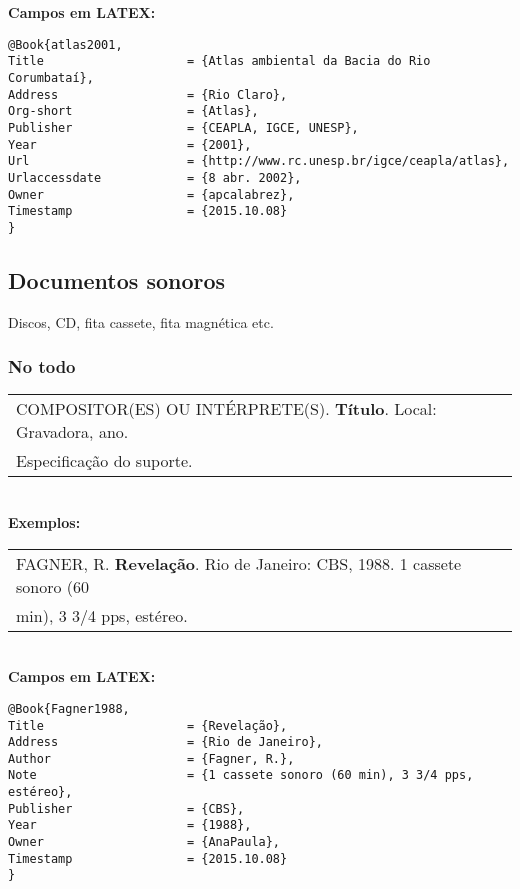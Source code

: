 \textbf{Campos em LATEX:} 

\begin{verbatim}
@Book{atlas2001,
Title                    = {Atlas ambiental da Bacia do Rio Corumbataí},
Address                  = {Rio Claro},
Org-short                = {Atlas},
Publisher                = {CEAPLA, IGCE, UNESP},
Year                     = {2001},
Url                      = {http://www.rc.unesp.br/igce/ceapla/atlas},
Urlaccessdate            = {8 abr. 2002},
Owner                    = {apcalabrez},
Timestamp                = {2015.10.08}
}
\end{verbatim}

\subsection{Documentos sonoros}

Discos, CD, fita cassete, fita magnética etc. \\
\subsubsection{No todo}

\begin{tabular}{|l|c|} \hline
	COMPOSITOR(ES) OU INTÉRPRETE(S). \textbf{Título}. Local: Gravadora, ano. \\
	Especificação do suporte. 
	\\\hline
\end{tabular} \\

\textbf{Exemplos:} \\

\begin{tabular}{|l|c|} \hline
	FAGNER, R. \textbf{Revelação}. Rio de Janeiro: CBS, 1988. 1 cassete sonoro (60 \\
	min), 3 3/4 pps, estéreo.  
	\\\hline
\end{tabular} \\

\textbf{Campos em LATEX:} 

\begin{verbatim}
@Book{Fagner1988,
Title                    = {Revelação},
Address                  = {Rio de Janeiro},
Author                   = {Fagner, R.},
Note                     = {1 cassete sonoro (60 min), 3 3/4 pps, 
estéreo},
Publisher                = {CBS},
Year                     = {1988},
Owner                    = {AnaPaula},
Timestamp                = {2015.10.08}
}
\end{verbatim}

